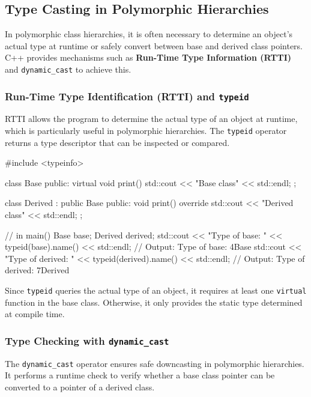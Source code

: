\subsection{Type Casting in Polymorphic Hierarchies}

In polymorphic class hierarchies, it is often necessary to determine an object's actual type at runtime or safely convert between base and derived class pointers. C++ provides mechanisms such as \textbf{Run-Time Type Information (RTTI)} and \texttt{dynamic\_cast} to achieve this.

\subsubsection{Run-Time Type Identification (RTTI) and \texttt{typeid}}

RTTI allows the program to determine the actual type of an object at runtime, which is particularly useful in polymorphic hierarchies.
The \texttt{typeid} operator returns a type descriptor that can be inspected or compared.

\begin{codeblock}[language=C++]
#include <typeinfo>

class Base {
public:
    virtual void print() { std::cout << "Base class" << std::endl; }
};

class Derived : public Base {
public:
    void print() override { std::cout << "Derived class" << std::endl; }
};

// in main()
Base base;
Derived derived;
std::cout << "Type of base: " << typeid(base).name() << std::endl;
// Output: Type of base: 4Base
std::cout << "Type of derived: " << typeid(derived).name() << std::endl;
// Output: Type of derived: 7Derived
\end{codeblock}

Since \texttt{typeid} queries the actual type of an object, it requires at least one \texttt{virtual} function in the base class. Otherwise, it only provides the static type determined at compile time.

\subsubsection{Type Checking with \texttt{dynamic\_cast}}

The \texttt{dynamic\_cast} operator ensures safe downcasting in polymorphic hierarchies. It performs a runtime check to verify whether a base class pointer can be converted to a pointer of a derived class.

